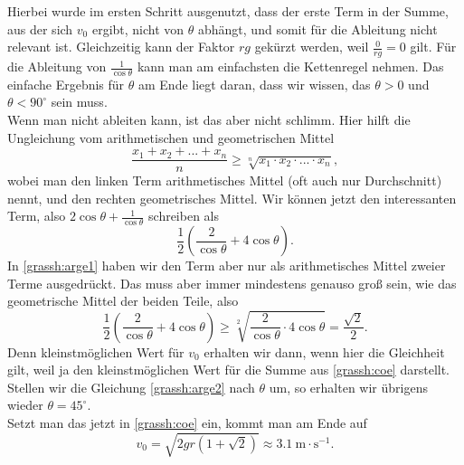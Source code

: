 \begin{Answer}[ref = grassh]
\begin{equation}
	\end{equation}
	Hierbei wurde im ersten Schritt ausgenutzt, dass der erste Term in der Summe, aus der sich $v_0$ ergibt, nicht von $\theta$ abhängt, und somit für die Ableitung nicht relevant ist. Gleichzeitig kann der Faktor $rg$ gekürzt werden, weil $\frac{0}{rg} = 0$ gilt. Für die Ableitung von $\frac{1}{\cos \theta}$ kann man am einfachsten die Kettenregel nehmen. Das einfache Ergebnis für $\theta$ am Ende liegt daran, dass wir wissen, das $\theta>0$ und $\theta<90^\circ$ sein muss.\\
	Wenn man nicht ableiten kann, ist das aber nicht schlimm. Hier hilft die Ungleichung vom arithmetischen und geometrischen Mittel
	\begin{equation}\label{grassh:arge}
	\frac{x_1+x_2+...+x_n}{n}\geq \sqrt[n]{x_1\cdot x_2 \cdot ... \cdot x_n},
	\end{equation} 
	wobei man den linken Term arithmetisches Mittel (oft auch nur Durchschnitt) nennt, und den rechten geometrisches Mittel.
	Wir können jetzt den interessanten Term, also $2 \cos \theta + \frac{1}{\cos \theta}$ schreiben als 
	\begin{equation}\label{grassh:arge1}
		\frac{1}{2}\left(\frac{2}{\cos \theta} + 4 \cos \theta\right).
	\end{equation}
	In \eqref{grassh:arge1} haben wir den Term aber nur als arithmetisches Mittel zweier Terme ausgedrückt. Das muss aber immer mindestens genauso groß sein, wie das geometrische Mittel der beiden Teile, also
	\begin{equation}\label{grassh:arge2}
		\frac{1}{2}\left(\frac{2}{\cos \theta} + 4 \cos \theta\right) \geq \sqrt[2]{\frac{2}{\cos \theta}\cdot 4 \cos \theta} = \frac{\sqrt{2}}{2}.
	\end{equation}
	Denn kleinstmöglichen Wert für $v_0$ erhalten wir dann, wenn hier die Gleichheit gilt, weil ja den kleinstmöglichen Wert für die Summe aus \eqref{grassh:coe} darstellt. Stellen wir die Gleichung \eqref{grassh:arge2} nach $\theta$ um, so erhalten wir übrigens wieder $\theta = 45^\circ$.\\
	Setzt man das jetzt in \eqref{grassh:coe} ein, kommt man am Ende auf
	\begin{equation*}
		\boxed{
		v_0 = \sqrt{2gr\left(1+\sqrt{2}\right)}\approx 3.1~\mathrm{m\cdot s^{-1}}.}
	\end{equation*}
\end{Answer}
